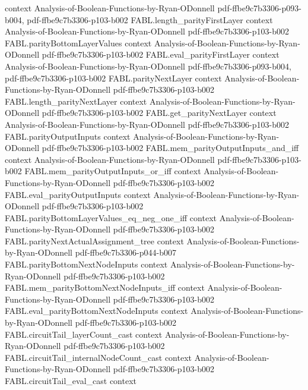 \begin{theorem}
  {context}
  {Analysis-of-Boolean-Functions-by-Ryan-ODonnell}
  {pdf-ffbe9c7b3306-p093-b004,
    pdf-ffbe9c7b3306-p103-b002}
\proofstep
  {FABL.length_parityFirstLayer}
  {context}
  {Analysis-of-Boolean-Functions-by-Ryan-ODonnell}
  {pdf-ffbe9c7b3306-p103-b002}
\proofstep
  {FABL.parityBottomLayerValues}
  {context}
  {Analysis-of-Boolean-Functions-by-Ryan-ODonnell}
  {pdf-ffbe9c7b3306-p103-b002}
\proofstep
  {FABL.eval_parityFirstLayer}
  {context}
  {Analysis-of-Boolean-Functions-by-Ryan-ODonnell}
  {pdf-ffbe9c7b3306-p093-b004,
    pdf-ffbe9c7b3306-p103-b002}
\proofstep
  {FABL.parityNextLayer}
  {context}
  {Analysis-of-Boolean-Functions-by-Ryan-ODonnell}
  {pdf-ffbe9c7b3306-p103-b002}
\proofstep
  {FABL.length_parityNextLayer}
  {context}
  {Analysis-of-Boolean-Functions-by-Ryan-ODonnell}
  {pdf-ffbe9c7b3306-p103-b002}
\proofstep
  {FABL.get_parityNextLayer}
  {context}
  {Analysis-of-Boolean-Functions-by-Ryan-ODonnell}
  {pdf-ffbe9c7b3306-p103-b002}
\proofstep
  {FABL.parityOutputInputs}
  {context}
  {Analysis-of-Boolean-Functions-by-Ryan-ODonnell}
  {pdf-ffbe9c7b3306-p103-b002}
\proofstep
  {FABL.mem_parityOutputInputs_and_iff}
  {context}
  {Analysis-of-Boolean-Functions-by-Ryan-ODonnell}
  {pdf-ffbe9c7b3306-p103-b002}
\proofstep
  {FABL.mem_parityOutputInputs_or_iff}
  {context}
  {Analysis-of-Boolean-Functions-by-Ryan-ODonnell}
  {pdf-ffbe9c7b3306-p103-b002}
\proofstep
  {FABL.eval_parityOutputInputs}
  {context}
  {Analysis-of-Boolean-Functions-by-Ryan-ODonnell}
  {pdf-ffbe9c7b3306-p103-b002}
\proofstep
  {FABL.parityBottomLayerValues_eq_neg_one_iff}
  {context}
  {Analysis-of-Boolean-Functions-by-Ryan-ODonnell}
  {pdf-ffbe9c7b3306-p103-b002}
\proofstep
  {FABL.parityNextActualAssignment_tree}
  {context}
  {Analysis-of-Boolean-Functions-by-Ryan-ODonnell}
  {pdf-ffbe9c7b3306-p044-b007}
\proofstep
  {FABL.parityBottomNextNodeInputs}
  {context}
  {Analysis-of-Boolean-Functions-by-Ryan-ODonnell}
  {pdf-ffbe9c7b3306-p103-b002}
\proofstep
  {FABL.mem_parityBottomNextNodeInputs_iff}
  {context}
  {Analysis-of-Boolean-Functions-by-Ryan-ODonnell}
  {pdf-ffbe9c7b3306-p103-b002}
\proofstep
  {FABL.eval_parityBottomNextNodeInputs}
  {context}
  {Analysis-of-Boolean-Functions-by-Ryan-ODonnell}
  {pdf-ffbe9c7b3306-p103-b002}
\proofstep
  {FABL.circuitTail_layerCount_cast}
  {context}
  {Analysis-of-Boolean-Functions-by-Ryan-ODonnell}
  {pdf-ffbe9c7b3306-p103-b002}
\proofstep
  {FABL.circuitTail_internalNodeCount_cast}
  {context}
  {Analysis-of-Boolean-Functions-by-Ryan-ODonnell}
  {pdf-ffbe9c7b3306-p103-b002}
\proofstep
  {FABL.circuitTail_eval_cast}
  {context}

\end{theorem}

